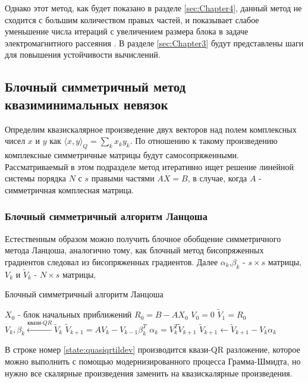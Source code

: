 Однако этот метод, как будет показано в разделе \ref{sec:Chapter4}, данный метод 
не сходится с большим количеством правых частей, и показывает слабое уменьшение 
числа итераций с увеличением размера блока в задаче электромагнитного рассеяния 
\cite{stavtsev2009application}. В разделе \ref{sec:Chapter3} будут представлены
шаги для повышения устойчивости вычислений. 
\subsection[Блочный симметричный метод квазиминимальных невязок]{Блочный симметричный метод квазиминимальных невязок \cite{doi:10.1137/0917019}}
Определим квазискалярное произведение двух векторов над полем комплексных чисел
 $x$ и $y$ как $\langle x,y\rangle _Q=\sum_k x_k y_k$. По отношению к такому произведению
 комплексные симметричные матрицы будут самосопряженными. Рассматриваемый в этом подразделе метод 
 итеративно ищет решение линейной системы порядка $N$ с $s$ правыми частями $AX=B$, в случае, когда $A$ - 
 симметричная комплесная матрица.   
\subsubsection[Блочный симметричный алгоритм Ланцоша]{Блочный симметричный алгоритм Ланцоша}
Естественным образом можно получить блочное обобщение симметричного метода Ланцоша, 
аналогично тому, как блочный метод бисопряженных градиентов следовал из бисопряженных градиентов.
Далее $\alpha_k$,$\beta_k$ - $s \times s$ матрицы, $V_k$ и $\tilde{V}_k$ - $N \times s$ 
матрицы, 
\begin{algorithm}
    \caption{Блочный симметричный алгоритм Ланцоша}
    \begin{algorithmic}[1]
        \State $X_0$ - блок начальных приближений
        \State $R_0 = B - AX_0$
        \State $V_0 = 0$
        \State $\tilde{V}_1 = R_0$
            \State $V_k, \beta_k \xleftarrow{\text{квази-} QR} \tilde{V}_k$ \label{state:quasiqrtildev}
            \State $\tilde{V}_{k+1} = AV_k - V_{k-1}\beta_k^T$
            \State $\alpha_k = V_k^T \tilde{V}_{k+1}$
            \State $\tilde{V}_{k+1} \gets \tilde{V}_{k+1} - V_k \alpha_k$
        \EndFor
    \end{algorithmic}
\end{algorithm}
В строке номер \ref{state:quasiqrtildev} производится квази-QR разложение, которое 
можно выполнить с помощью модернизированного процесса Грамма-Шмидта, но нужно все скалярные
произведения заменить на квазискалярные произведения. 

